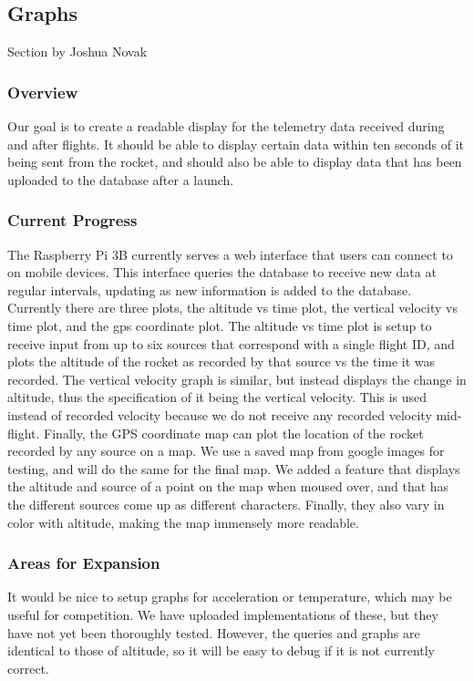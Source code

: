 \documentclass[onecolumn, draftclsnofoot, 10pt, compsoc]{IEEEtran}
\begin{document}

\subsection{Graphs}
Section by Joshua Novak
\subsubsection{Overview}

Our goal is to create a readable display for the telemetry data received during and after flights. It should be able to display certain data within ten seconds of it being sent from the rocket, and should also be able to display data that has been uploaded to the database after a launch.
\subsubsection{Current Progress}

The Raspberry Pi 3B currently serves a web interface that users can connect to on mobile devices. This interface queries the database to receive new data at regular intervals, updating as new information is added to the database. Currently there are three plots, the altitude vs time plot, the vertical velocity vs time plot, and the gps coordinate plot. The altitude vs time plot is setup to receive input from up to six sources that correspond with a single flight ID, and plots the altitude of the rocket as recorded by that source vs the time it was recorded. The vertical velocity graph is similar, but instead displays the change in altitude, thus the specification of it being the vertical velocity. This is used instead of recorded velocity because we do not receive any recorded velocity mid-flight. Finally, the GPS coordinate map can plot the location of the rocket recorded by any source on a map. We use a saved map from google images for testing, and will do the same for the final map. We added a feature that displays the altitude and source of a point on the map when moused over, and that has the different sources come up as different characters. Finally, they also vary in color with altitude, making the map immensely more readable.

\subsubsection{Areas for Expansion}
It would be nice to setup graphs for acceleration or temperature, which may be useful for competition. We have uploaded implementations of these, but they have not yet been thoroughly tested. However, the queries and graphs are identical to those of altitude, so it will be easy to debug if it is not currently correct.
\end{document}
